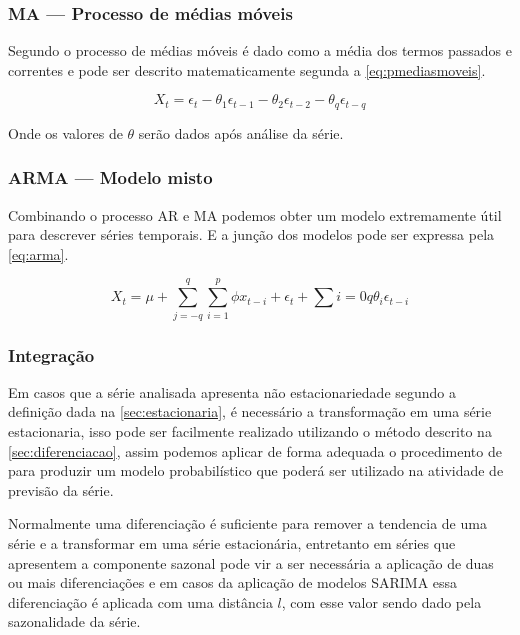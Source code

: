 \documentclass[
    12pt,
    oneside,
    a4paper,
    english,
    brazil
]{abntex2}
\begin{document}
\subsubsection{MA --- Processo de médias móveis}


Segundo  o processo de  médias móveis é dado como
a média  dos termos passados  e correntes  e pode ser  descrito matematicamente
segunda a \autoref{eq:pmediasmoveis}.

\begin{equation}
    \label{eq:pmediasmoveis}
    X_t = \epsilon_t - \theta_1\epsilon_{t-1} - \theta_2\epsilon_{t-2} - \theta_{q}\epsilon_{t-q}
\end{equation}

Onde os valores de $\theta$ serão dados após análise da série.

\subsubsection{ARMA --- Modelo misto}

Combinando o  processo AR e MA  podemos obter um modelo  extremamente útil para
descrever  séries temporais.  E a  junção dos  modelos pode  ser expressa  pela
\autoref{eq:arma}.

\begin{equation}
    \label{eq:arma}
    X_t = \mu + \sum_{j=-q}^{q}\sum_{i = 1}^{p} \phi{}x_{t-i}+\epsilon_t+\sum{i = 0}{q}\theta_i\epsilon_{t-i}
\end{equation}

\subsubsection{Integração}

Em  casos  que a  série  analisada  apresenta  não estacionariedade  segundo  a
definição dada  na \autoref{sec:estacionaria}, é necessário  a transformação em
uma  série  estacionaria,  isso  pode ser  facilmente  realizado  utilizando  o
método  descrito  na  \autoref{sec:diferenciacao},  assim  podemos  aplicar  de
forma  adequada o  procedimento  de   para  produzir um  modelo
probabilístico que poderá ser utilizado na atividade de previsão da série.

Normalmente  uma diferenciação  é suficiente  para remover  a tendencia  de uma
série  e a  transformar em  uma série  estacionária, entretanto  em séries  que
apresentem a componente  sazonal pode vir a ser necessária  a aplicação de duas
ou  mais  diferenciações  e  em  casos da  aplicação  de  modelos  SARIMA  essa
diferenciação é aplicada com uma distância  $l$, com esse valor sendo dado pela
sazonalidade da série.
\end{document}
